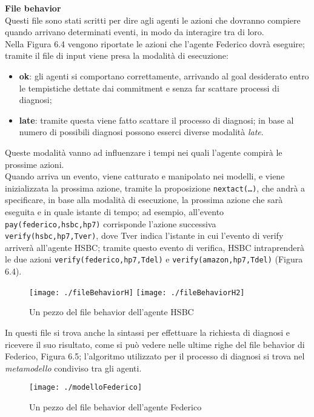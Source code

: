 \documentclass[a4paper,12pt]{report}
\begin{document}
\newpage
\textbf{File behavior}\\
Questi file sono stati scritti per dire agli agenti le azioni che dovranno compiere quando arrivano determinati eventi, in modo da interagire tra di loro.\\
Nella Figura 6.4 vengono riportate le azioni che l'agente Federico dovrà eseguire; tramite il file di input viene presa la modalità di esecuzione:
\begin{itemize}
    \item \textbf{ok}: gli agenti si comportano correttamente, arrivando al goal desiderato entro le tempistiche dettate dai commitment e senza far scattare processi di diagnosi;
    \item \textbf{late}: tramite questa viene fatto scattare il processo di diagnosi; in base al numero di possibili diagnosi possono esserci diverse modalità \textit{late}.
\end{itemize}
Queste modalità vanno ad influenzare i tempi nei quali l'agente compirà le prossime azioni.\\
Quando arriva un evento, viene catturato e manipolato nei modelli, e viene inizializzata la prossima azione, tramite la proposizione \texttt{nextact(\dots)}, che andrà a specificare, in base alla modalità di esecuzione, la prossima azione che sarà eseguita e in quale istante di tempo; ad esempio, all'evento \\\texttt{pay(federico,hsbc,hp7)} corrisponde l'azione successiva \\\texttt{verify(hsbc,hp7,Tver)}, dove Tver indica l'istante in cui l'evento di verify arriverà all'agente HSBC; tramite questo evento di verifica, HSBC intraprenderà le due azioni \texttt{verify(federico,hp7,Tdel)} e \texttt{verify(amazon,hp7,Tdel)} (Figura 6.4).
\newpage
\begin{figure}[h]
    \texttt{[image: ./fileBehaviorH]}
    \bigskip
    \texttt{[image: ./fileBehaviorH2]}
    \caption{Un pezzo del file behavior dell'agente HSBC}
\end{figure}
\bigskip
In questi file si trova anche la sintassi per effettuare la richiesta di diagnosi e ricevere il suo risultato, come si può vedere nelle ultime righe del file behavior di Federico, Figura 6.5; l'algoritmo utilizzato per il processo di diagnosi si trova nel \textit{metamodello} condiviso tra gli agenti.
\begin{figure}[h]
    \texttt{[image: ./modelloFederico]}
    \caption{Un pezzo del file behavior dell'agente Federico}
\end{figure}
\end{document}
